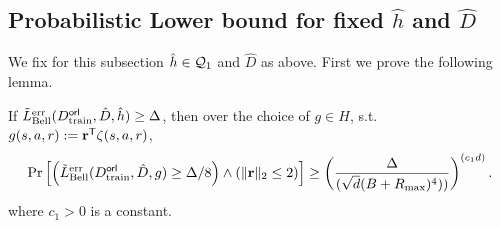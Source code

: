\subsection{Probabilistic Lower bound for  fixed $\hat{h}$ and $\hat{D}$}
We fix for this subsection $\hat{h} \in \mathcal{Q}_1$ and $\hat{D}$ as above. 
First we prove the following lemma.
\begin{lemma}
    If $\tilde{L}^{\textnormal{err}}_{\textnormal{Bell}}(D^{\sf orl}_{\textnormal{train}},  \hat{D}, \hat{h}) \geq \Delta$, then  over the choice of $g \in H$, s.t. $g(s,a,r) := {\mathbf{r}}^{\sf T}\zeta(s,a,r)$,
    \begin{equation}
        \Pr\left[\left(\tilde{L}^{\textnormal{err}}_{\textnormal{Bell}}(D^{\sf orl}_{\textnormal{train}},  \hat{D}, g) \geq \Delta/8\right)\wedge\left(\|{\mathbf{r}}\|_2 \leq 2\right)\right] \geq \left(\frac{\Delta}{(\sqrt{d}(B + R_{\textnormal{max}})^4))}\right)^{(c_1 d)}.
    \end{equation}
    where $c_1 > 0$ is a constant.
\end{lemma}
